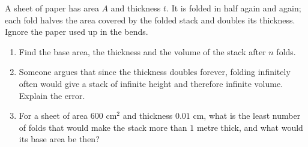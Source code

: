A sheet of paper has area $A$ and thickness $t$. It is folded in half again and again; each fold halves the area covered by the folded stack and doubles its thickness. Ignore the paper used up in the bends.
\begin{enumerate}
\item[(a)] Find the base area, the thickness and the volume of the stack after $n$ folds.
\item[(b)] Someone argues that since the thickness doubles forever, folding infinitely often would give a stack of infinite height and therefore infinite volume. Explain the error.
\item[(c)] For a sheet of area $600$ cm$^2$ and thickness $0.01$ cm, what is the least number of folds that would make the stack more than $1$ metre thick, and what would its base area be then?
\end{enumerate}

